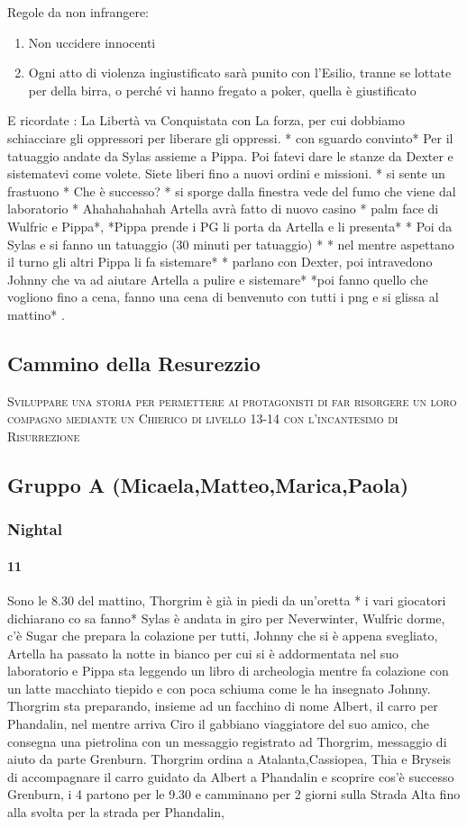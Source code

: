 \documentclass{article}
\begin{document}
Regole da non infrangere: 
\begin{enumerate}
    \item Non uccidere innocenti
    \item Ogni atto di violenza ingiustificato sarà punito con l’Esilio, tranne se lottate per della birra, o perché vi hanno fregato a poker, quella è giustificato
\end{enumerate}

E ricordate : La Libertà va Conquistata con La forza, per cui dobbiamo schiacciare gli oppressori per liberare gli oppressi. * con sguardo convinto* 
 Per il tatuaggio andate da Sylas assieme a Pippa. 
Poi fatevi dare le stanze da Dexter e sistematevi come volete. Siete liberi fino a nuovi ordini e missioni. * si sente un frastuono * Che è successo? * si sporge dalla finestra vede del fumo che viene dal laboratorio * Ahahahahahah Artella avrà fatto di nuovo casino * palm face di Wulfric e Pippa*, *Pippa prende i PG li porta da Artella e li presenta* * Poi da Sylas e si fanno un tatuaggio (30 minuti per tatuaggio) * * nel mentre aspettano il turno gli altri Pippa li fa sistemare* * parlano con Dexter, poi intravedono Johnny che va ad aiutare Artella a pulire e sistemare* *poi fanno quello che vogliono fino a cena, fanno una cena di benvenuto con tutti i png e si glissa al mattino* .
          \subsection{Cammino della Resurezzio} \textsc{Sviluppare una storia per permettere ai protagonisti di far risorgere un loro compagno mediante un Chierico di livello 13-14 con l'incantesimo di Risurrezione}
          \subsection{Gruppo A (Micaela,Matteo,Marica,Paola)}
                  \subsubsection{Nightal}
                      \paragraph{11}
    Sono le 8.30 del mattino, Thorgrim è già in piedi da un’oretta * i vari giocatori dichiarano co sa fanno* Sylas è andata in giro per Neverwinter, Wulfric dorme, c’è Sugar che prepara la colazione per tutti, Johnny che si è appena svegliato, Artella ha passato la notte in bianco per cui si è addormentata nel suo laboratorio e Pippa sta leggendo un libro di archeologia mentre fa colazione con un latte macchiato tiepido e con poca schiuma come le ha insegnato Johnny. Thorgrim sta preparando, insieme ad un facchino di nome Albert, il carro per Phandalin, nel mentre arriva Ciro il gabbiano viaggiatore del suo amico, che consegna una pietrolina con un messaggio registrato ad Thorgrim, messaggio di aiuto da parte Grenburn. Thorgrim ordina a Atalanta,Cassiopea, Thia e Bryseis di accompagnare il carro guidato da Albert a Phandalin e scoprire cos’è successo Grenburn, i 4 partono per le 9.30 e camminano per 2 giorni sulla Strada Alta fino alla svolta per la strada per Phandalin,  
\end{document}
